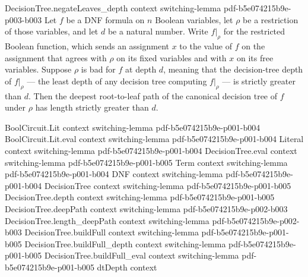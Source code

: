 \begin{lemma}
\proofstep
  {DecisionTree.negateLeaves_depth}
  {context}
  {switching-lemma}
  {pdf-b5e074215b9e-p003-b003}
Let $f$ be a DNF formula on $n$ Boolean variables, let $\rho$ be a restriction of those
variables, and let $d$ be a natural number. Write $f|_\rho$ for the restricted Boolean
function, which sends an assignment $x$ to the value of $f$ on the assignment that
agrees with $\rho$ on its fixed variables and with $x$ on its free variables. Suppose
$\rho$ is bad for $f$ at depth $d$, meaning that the decision-tree depth of $f|_\rho$ —
the least depth of any decision tree computing $f|_\rho$ — is strictly greater than $d$.
Then the deepest root-to-leaf path of the canonical decision tree of $f$ under $\rho$
has length strictly greater than $d$.
\end{lemma}

\begin{lemma}
\label{SwitchingLemma.razborovEncode_path_length}
\leanok
{}
\proofstep
  {BoolCircuit.Lit}
  {context}
  {switching-lemma}
  {pdf-b5e074215b9e-p001-b004}
\proofstep
  {BoolCircuit.Lit.eval}
  {context}
  {switching-lemma}
  {pdf-b5e074215b9e-p001-b004}
\proofstep
  {Literal}
  {context}
  {switching-lemma}
  {pdf-b5e074215b9e-p001-b004}
\proofstep
  {DecisionTree.eval}
  {context}
  {switching-lemma}
  {pdf-b5e074215b9e-p001-b005}
\proofstep
  {Term}
  {context}
  {switching-lemma}
  {pdf-b5e074215b9e-p001-b004}
\proofstep
  {DNF}
  {context}
  {switching-lemma}
  {pdf-b5e074215b9e-p001-b004}
\proofstep
  {DecisionTree}
  {context}
  {switching-lemma}
  {pdf-b5e074215b9e-p001-b005}
\proofstep
  {DecisionTree.depth}
  {context}
  {switching-lemma}
  {pdf-b5e074215b9e-p001-b005}
\proofstep
  {DecisionTree.deepPath}
  {context}
  {switching-lemma}
  {pdf-b5e074215b9e-p002-b003}
\proofstep
  {DecisionTree.length_deepPath}
  {context}
  {switching-lemma}
  {pdf-b5e074215b9e-p002-b003}
\proofstep
  {DecisionTree.buildFull}
  {context}
  {switching-lemma}
  {pdf-b5e074215b9e-p001-b005}
\proofstep
  {DecisionTree.buildFull_depth}
  {context}
  {switching-lemma}
  {pdf-b5e074215b9e-p001-b005}
\proofstep
  {DecisionTree.buildFull_eval}
  {context}
  {switching-lemma}
  {pdf-b5e074215b9e-p001-b005}
\proofstep
  {dtDepth}
  {context}

\end{lemma}
